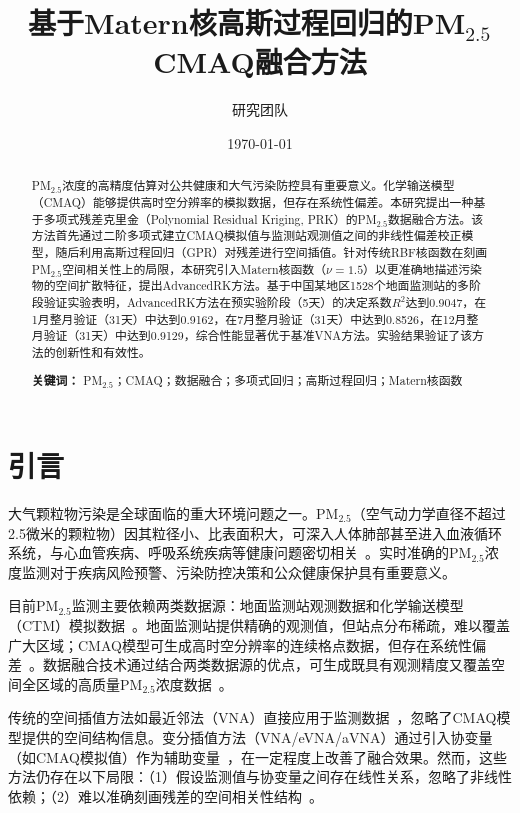 \documentclass[UTF8, a4paper, 12pt]{article}
\title{基于Matern核高斯过程回归的PM$_{2.5}$ CMAQ融合方法}
\author{研究团队}
\date{\today}
\begin{document}
\maketitle

\begin{abstract}
PM$_{2.5}$浓度的高精度估算对公共健康和大气污染防控具有重要意义。化学输送模型（CMAQ）能够提供高时空分辨率的模拟数据，但存在系统性偏差。本研究提出一种基于多项式残差克里金（Polynomial Residual Kriging, PRK）的PM$_{2.5}$数据融合方法。该方法首先通过二阶多项式建立CMAQ模拟值与监测站观测值之间的非线性偏差校正模型，随后利用高斯过程回归（GPR）对残差进行空间插值。针对传统RBF核函数在刻画PM$_{2.5}$空间相关性上的局限，本研究引入Matern核函数（$\nu=1.5$）以更准确地描述污染物的空间扩散特征，提出AdvancedRK方法。基于中国某地区1528个地面监测站的多阶段验证实验表明，AdvancedRK方法在预实验阶段（5天）的决定系数$R^2$达到0.9047，在1月整月验证（31天）中达到0.9162，在7月整月验证（31天）中达到0.8526，在12月整月验证（31天）中达到0.9129，综合性能显著优于基准VNA方法。实验结果验证了该方法的创新性和有效性。

\textbf{关键词：} PM$_{2.5}$；CMAQ；数据融合；多项式回归；高斯过程回归；Matern核函数
\end{abstract}

\section{引言}

大气颗粒物污染是全球面临的重大环境问题之一。PM$_{2.5}$（空气动力学直径不超过2.5微米的颗粒物）因其粒径小、比表面积大，可深入人体肺部甚至进入血液循环系统，与心血管疾病、呼吸系统疾病等健康问题密切相关~\cite{brooks2015review}。实时准确的PM$_{2.5}$浓度监测对于疾病风险预警、污染防控决策和公众健康保护具有重要意义。

目前PM$_{2.5}$监测主要依赖两类数据源：地面监测站观测数据和化学输送模型（CTM）模拟数据~\cite{zheng2020kriging}。地面监测站提供精确的观测值，但站点分布稀疏，难以覆盖广大区域；CMAQ模型可生成高时空分辨率的连续格点数据，但存在系统性偏差~\cite{foley2010CMAQ}。数据融合技术通过结合两类数据源的优点，可生成既具有观测精度又覆盖空间全区域的高质量PM$_{2.5}$浓度数据~\cite{reich2014ensemble}。

传统的空间插值方法如最近邻法（VNA）直接应用于监测数据~\cite{singh2019enhanced}，忽略了CMAQ模型提供的空间结构信息。变分插值方法（VNA/eVNA/aVNA）通过引入协变量（如CMAQ模拟值）作为辅助变量~\cite{liu2019spatial}，在一定程度上改善了融合效果。然而，这些方法仍存在以下局限：（1）假设监测值与协变量之间存在线性关系，忽略了非线性依赖；（2）难以准确刻画残差的空间相关性结构~\cite{cooley2007kriging}。
\end{document}
